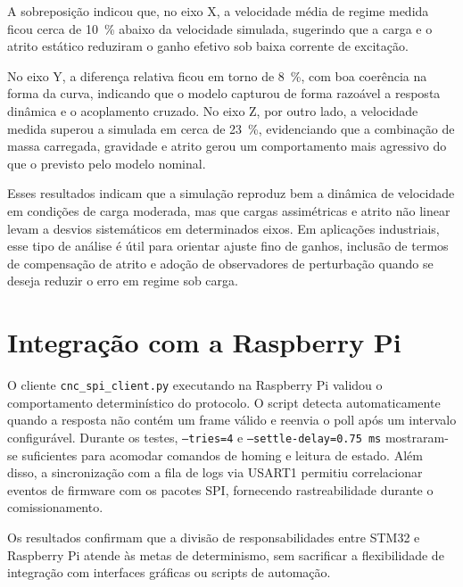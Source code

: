 A sobreposi\c{c}\~ao indicou que, no eixo X, a velocidade m\'edia de regime medida
ficou cerca de \SI{10}{\percent} abaixo da velocidade simulada,
sugerindo que a carga e o atrito est\'atico reduziram o ganho efetivo sob
baixa corrente de excita\c{c}\~ao.

No eixo Y, a diferen\c{c}a relativa ficou em torno de \SI{8}{\percent},
com boa coer\^encia na forma da curva, indicando que o modelo capturou de
forma razo\'avel a resposta din\^amica e o acoplamento cruzado. No eixo Z,
por outro lado, a velocidade medida superou a simulada em cerca de
\SI{23}{\percent}, evidenciando que a combina\c{c}\~ao de massa carregada,
gravidade e atrito gerou um comportamento mais agressivo do que o
previsto pelo modelo nominal.

Esses resultados indicam que a simula\c{c}\~ao reproduz bem a din\^amica
de velocidade em condi\c{c}\~oes de carga moderada, mas que cargas
assim\'etricas e atrito n\~ao linear levam a desvios sistem\'aticos em
determinados eixos. Em aplica\c{c}\~oes industriais, esse tipo de an\'alise
\'e \'util para orientar ajuste fino de ganhos, inclus\~ao de termos de
compensa\c{c}\~ao de atrito e ado\c{c}\~ao de observadores de perturba\c{c}\~ao
quando se deseja reduzir o erro em regime sob carga.

\section{Integração com a Raspberry Pi}

O cliente \texttt{cnc\_spi\_client.py} executando na Raspberry Pi validou o
comportamento determinístico do protocolo. O script detecta automaticamente
quando a resposta não contém um frame válido e reenvia o poll após um
intervalo configurável. Durante os testes, \texttt{--tries=4} e
\texttt{--settle-delay=0.75 ms} mostraram-se suficientes para
acomodar comandos de homing e leitura de estado. Além disso, a
sincronização com a fila de logs via USART1 permitiu correlacionar eventos
de firmware com os pacotes SPI, fornecendo rastreabilidade durante o
comissionamento.

Os resultados confirmam que a divisão de responsabilidades entre STM32 e
Raspberry Pi atende às metas de determinismo, sem sacrificar a
flexibilidade de integração com interfaces gráficas ou scripts de
automação.
